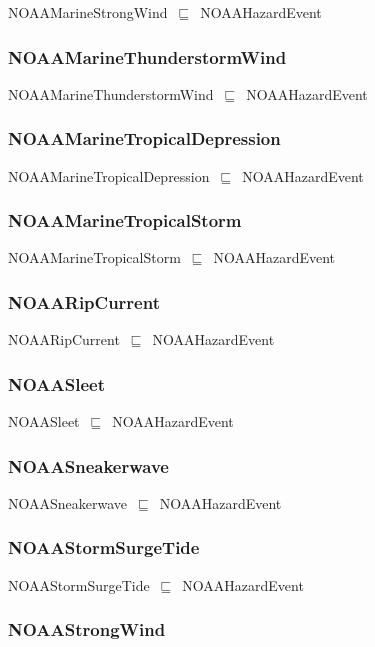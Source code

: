 \documentclass{article}
\begin{document}
NOAAMarineStrongWind~\ensuremath{\sqsubseteq}~NOAAHazardEvent~

\subsubsection*{NOAAMarineThunderstormWind}

NOAAMarineThunderstormWind~\ensuremath{\sqsubseteq}~NOAAHazardEvent~

\subsubsection*{NOAAMarineTropicalDepression}

NOAAMarineTropicalDepression~\ensuremath{\sqsubseteq}~NOAAHazardEvent~

\subsubsection*{NOAAMarineTropicalStorm}

NOAAMarineTropicalStorm~\ensuremath{\sqsubseteq}~NOAAHazardEvent~

\subsubsection*{NOAARipCurrent}

NOAARipCurrent~\ensuremath{\sqsubseteq}~NOAAHazardEvent~

\subsubsection*{NOAASleet}

NOAASleet~\ensuremath{\sqsubseteq}~NOAAHazardEvent~

\subsubsection*{NOAASneakerwave}

NOAASneakerwave~\ensuremath{\sqsubseteq}~NOAAHazardEvent~

\subsubsection*{NOAAStormSurgeTide}

NOAAStormSurgeTide~\ensuremath{\sqsubseteq}~NOAAHazardEvent~

\subsubsection*{NOAAStrongWind}
\end{document}
